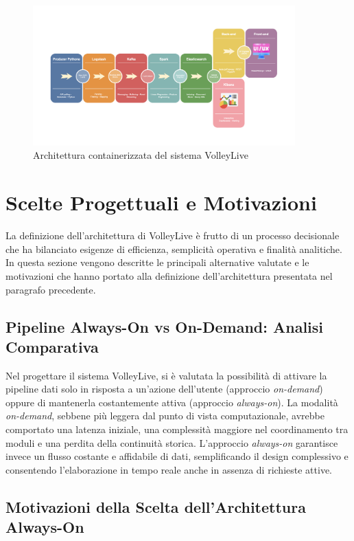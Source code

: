 \documentclass[a4paper,12pt]{report}
\begin{document}
\begin{figure}[ht]
    \centering
    \includegraphics[width=0.9\textwidth]{schema-architettura.png}
    \caption{Architettura containerizzata del sistema VolleyLive}
    \label{fig:architettura}
\end{figure}


\section{Scelte Progettuali e Motivazioni}

La definizione dell’architettura di VolleyLive è frutto di un processo decisionale che ha bilanciato esigenze di efficienza, semplicità operativa e finalità analitiche.
In questa sezione vengono descritte le principali alternative valutate e le motivazioni che hanno portato alla definizione dell’architettura presentata nel paragrafo precedente.

\subsection{Pipeline Always-On vs On-Demand: Analisi Comparativa}

Nel progettare il sistema VolleyLive, si è valutata la possibilità di attivare la pipeline dati solo in risposta a un’azione dell’utente (approccio \textit{on-demand}) oppure di mantenerla costantemente attiva (approccio \textit{always-on}). La modalità \textit{on-demand}, sebbene più leggera dal punto di vista computazionale, avrebbe comportato una latenza iniziale, una complessità maggiore nel coordinamento tra moduli e una perdita della continuità storica. L’approccio \textit{always-on} garantisce invece un flusso costante e affidabile di dati, semplificando il design complessivo e consentendo l’elaborazione in tempo reale anche in assenza di richieste attive.

\subsection{Motivazioni della Scelta dell’Architettura Always-On}
\end{document}
